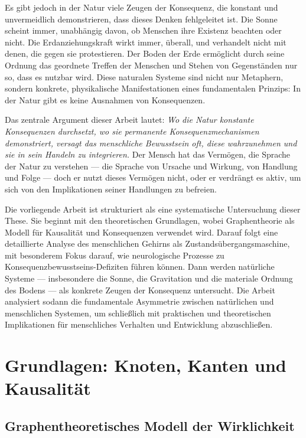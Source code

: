 \documentclass[12pt,a4paper]{article}
\begin{document}
Es gibt jedoch in der Natur viele Zeugen der Konsequenz, die konstant und unvermeidlich demonstrieren, dass dieses Denken fehlgeleitet ist. Die Sonne scheint immer, unabhängig davon, ob Menschen ihre Existenz beachten oder nicht. Die Erdanziehungskraft wirkt immer, überall, und verhandelt nicht mit denen, die gegen sie protestieren. Der Boden der Erde ermöglicht durch seine Ordnung das geordnete Treffen der Menschen und Stehen von Gegenständen nur so, dass es nutzbar wird. Diese naturalen Systeme sind nicht nur Metaphern, sondern konkrete, physikalische Manifestationen eines fundamentalen Prinzips: In der Natur gibt es keine Ausnahmen von Konsequenzen.

Das zentrale Argument dieser Arbeit lautet: \textit{Wo die Natur konstante Konsequenzen durchsetzt, wo sie permanente Konsequenzmechanismen demonstriert, versagt das menschliche Bewusstsein oft, diese wahrzunehmen und sie in sein Handeln zu integrieren.} Der Mensch hat das Vermögen, die Sprache der Natur zu verstehen — die Sprache von Ursache und Wirkung, von Handlung und Folge — doch er nutzt dieses Vermögen nicht, oder er verdrängt es aktiv, um sich von den Implikationen seiner Handlungen zu befreien.

Die vorliegende Arbeit ist strukturiert als eine systematische Untersuchung dieser These. Sie beginnt mit den theoretischen Grundlagen, wobei Graphentheorie als Modell für Kausalität und Konsequenzen verwendet wird. Darauf folgt eine detaillierte Analyse des menschlichen Gehirns als Zustandsübergangsmaschine, mit besonderem Fokus darauf, wie neurologische Prozesse zu Konsequenzbewusstseins-Defiziten führen können. Dann werden natürliche Systeme — insbesondere die Sonne, die Gravitation und die materiale Ordnung des Bodens — als konkrete Zeugen der Konsequenz untersucht. Die Arbeit analysiert sodann die fundamentale Asymmetrie zwischen natürlichen und menschlichen Systemen, um schließlich mit praktischen und theoretischen Implikationen für menschliches Verhalten und Entwicklung abzuschließen.

\section{Grundlagen: Knoten, Kanten und Kausalität}

\subsection{Graphentheoretisches Modell der Wirklichkeit}
\end{document}
